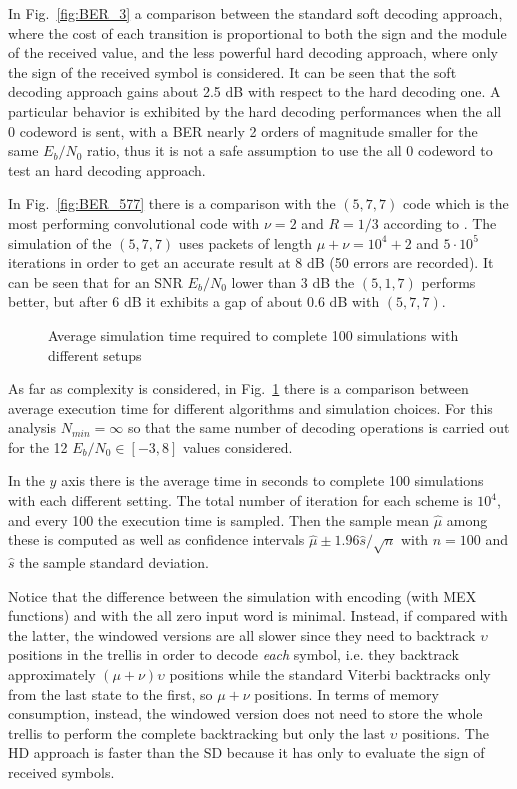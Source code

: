 \documentclass[10pt]{article}
\newlength\fheight
\newlength\fwidth
\begin{document}
In Fig.~\ref{fig:BER_3} a comparison between the standard soft decoding approach, where the cost of each transition is proportional to both the sign and the module of the received value, and the less powerful hard decoding approach, where only the sign of the received symbol is considered. 
It can be seen that the soft decoding approach gains about 2.5 dB with respect to the hard decoding one. A particular behavior is exhibited by the hard decoding performances when the all 0 codeword is sent, with a BER nearly 2 orders of magnitude smaller for the same $E_b/N_0$ ratio, thus it is not a safe assumption to use the all 0 codeword to test an hard decoding approach. 

In Fig.~\ref{fig:BER_577} there is a comparison with the $(5, 7, 7)$ code which is the most performing convolutional code with $\nu = 2$ and $R=1/3$ according to \cite{proakis}. The simulation of the $(5,7,7)$ uses packets of length $\mu + \nu = 10^4 + 2$ and $5\cdot10^{5}$ iterations in order to get an accurate result at 8 dB (50 errors are recorded). It can be seen that for an SNR $E_b/N_0$ lower than 3 dB the $(5,1,7)$ performs better, but after 6 dB it exhibits a gap of about 0.6 dB with $(5,7,7)$.

\begin{figure}[h!]
\centering
\setlength{}
\setlength{}

\caption{Average simulation time required to complete 100 simulations with different setups}
\label{fig:perf}
\end{figure}

As far as complexity is considered, in Fig.~\ref{fig:perf} there is a comparison between average execution time for different algorithms and simulation choices. 
For this analysis $N_{min} = \infty$ so that the same number of decoding operations is carried out for the 12 $E_b/N_0 \in [-3, 8]$ values considered. 

In the $y$ axis there is the average time in seconds to complete 100 simulations with each different setting. The total number of iteration for each scheme is $10^4$, and every 100 the execution time is sampled. Then the sample mean $\hat{\mu}$ among these is computed as well as confidence intervals $\hat{\mu} \pm 1.96\hat{s}/\sqrt{n}$ with $n=100$ and $\hat{s}$ the sample standard deviation.

Notice that the difference between the simulation with encoding (with MEX functions) and with the all zero input word is minimal. Instead, if compared with the latter, the windowed versions are all slower since they need to backtrack $\upsilon$ positions in the trellis in order to decode \emph{each} symbol, i.e. they backtrack approximately $(\mu + \nu)\upsilon$ positions while the standard Viterbi backtracks only from the last state to the first, so $\mu+\nu$ positions. In terms of memory consumption, instead, the windowed version does not need to store the whole trellis to perform the complete backtracking but only the last $\upsilon$ positions. The HD approach is faster than the SD because it has only to evaluate the sign of received symbols.
\end{document}
